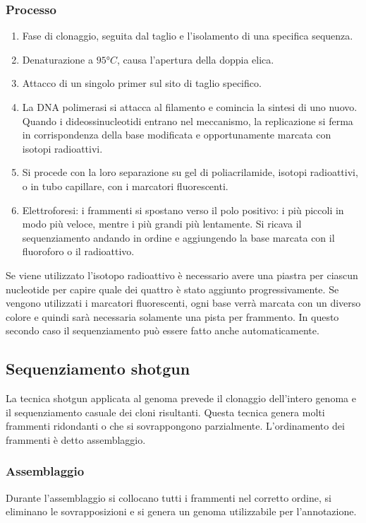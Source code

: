 		\subsubsection{Processo}
		\begin{multicols}{2}
			\begin{enumerate}
    				\item Fase di clonaggio, seguita dal taglio e l'isolamento di una specifica sequenza.
    				\item Denaturazione a $95\si{\degree C}$, causa l'apertura della doppia elica.
    				\item Attacco di un singolo primer sul sito di taglio specifico.
    				\item La DNA polimerasi si attacca al filamento e comincia la sintesi di uno nuovo. 
					Quando i dideossinucleotidi entrano nel meccanismo, la replicazione si ferma in corrispondenza della base modificata e opportunamente marcata con isotopi radioattivi.
    				\item Si procede con la loro separazione su gel di poliacrilamide, isotopi radioattivi, o in tubo capillare, con i marcatori fluorescenti. 
				\item Elettroforesi: i frammenti si spostano verso il polo positivo: i pi\`u piccoli in modo pi\`u veloce, mentre i pi\`u grandi pi\`u lentamente. 
					Si ricava il sequenziamento andando in ordine e aggiungendo la base marcata con il fluoroforo o il radioattivo.
			\end{enumerate}
		\end{multicols}
		Se viene utilizzato l'isotopo radioattivo \`e necessario avere una piastra per ciascun nucleotide per capire quale dei quattro \`e stato aggiunto progressivamente. 
		Se vengono utilizzati i marcatori fluorescenti, ogni base verr\`a marcata con un diverso colore e quindi sar\`a necessaria solamente una pista per frammento. 
		In questo secondo caso il sequenziamento pu\`o essere fatto anche automaticamente. 

	\subsection{Sequenziamento shotgun}
	La tecnica shotgun applicata al genoma prevede il clonaggio dell'intero genoma e il sequenziamento casuale dei cloni risultanti. 
	Questa tecnica genera molti frammenti ridondanti o che si sovrappongono parzialmente. 
	L'ordinamento dei frammenti \`e detto assemblaggio. 

		\subsubsection{Assemblaggio}
		Durante l'assemblaggio si collocano tutti i frammenti nel corretto ordine, si eliminano le sovrapposizioni e si genera un genoma utilizzabile per l'annotazione.

